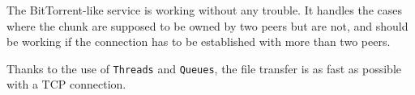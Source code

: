 The BitTorrent-like service is working without any trouble. It handles the cases where the chunk are supposed to be owned by two peers but are not, and should be working if the connection has to be established with more than two peers.

Thanks to the use of \texttt{Threads} and \texttt{Queues}, the file transfer is as fast as possible with a TCP connection.